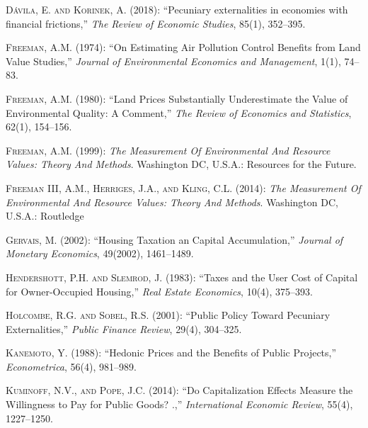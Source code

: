 \documentclass[ecta,nameyear,draft]{econsocart}
\theoremstyle{plain}
\theoremstyle{remark}
\begin{document}
\begin{thebibliography}{}
 
\textsc{Dávila, E. and Korinek, A.} (2018):
``Pecuniary externalities in economies with financial frictions,''
\textit{The Review of Economic Studies}, 85(1), 352--395.
\endbibitem

\textsc{Freeman, A.M.} (1974):
``On Estimating Air Pollution Control Benefits from Land Value Studies,''
\textit{Journal of Environmental Economics and Management}, 1(1), 74--83.
\endbibitem

\textsc{Freeman, A.M.} (1980):
``Land Prices Substantially Underestimate the Value of Environmental Quality: A Comment,''
\textit{The Review of Economics and Statistics}, 62(1), 154--156.
\endbibitem


\textsc{Freeman, A.M.} (1999):
\textit{The Measurement Of Environmental And Resource Values: Theory And Methods}.
Washington DC, U.S.A.: Resources for the Future.
\endbibitem
 
\textsc{Freeman III, A.M., Herriges, J.A., and Kling, C.L.} (2014):
\textit{The Measurement Of Environmental And Resource Values: Theory And Methods}.
Washington DC, U.S.A.: Routledge
\endbibitem 

\textsc{Gervais, M.} (2002):
``Housing Taxation an Capital Accumulation,''
\textit{Journal of Monetary Economics}, 49(2002), 1461--1489.
\endbibitem

\textsc{Hendershott, P.H. and Slemrod, J.} (1983):
``Taxes and the User Cost of Capital for Owner-Occupied Housing,''
\textit{Real Estate Economics}, 10(4), 375--393.
\endbibitem

\textsc{Holcombe, R.G. and Sobel, R.S.} (2001):
``Public Policy Toward Pecuniary Externalities,''
\textit{Public Finance Review}, 29(4), 304--325.
\endbibitem

\textsc{Kanemoto, Y.} (1988):
``Hedonic Prices and the Benefits of Public Projects,''
\textit{Econometrica}, 56(4), 981--989.
\endbibitem

\textsc{Kuminoff, N.V., and Pope, J.C.} (2014):
``Do Capitalization Effects Measure the Willingness to Pay for Public Goods?  .,''
\textit{International Economic Review}, 55(4), 1227--1250.
\endbibitem


\end{thebibliography}
\end{document}
